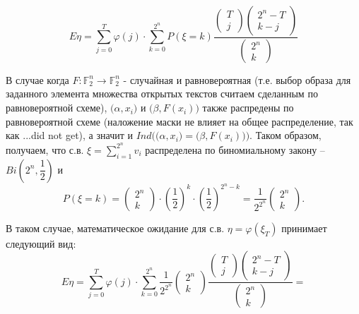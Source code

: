 \documentclass[utf8x, 14pt]{G7-32} %
\begin{document}
$$ E\eta = \sum_{j=0}^T \varphi(j)\cdot \sum_{k = 0}^{2^n} P(\xi = k) \dfrac{\left( \begin{aligned} T \\ j \end{aligned} \right) \left( \begin{aligned} 2^n-T \\ k-j \end{aligned} \right)}{\left( \begin{aligned} 2^n \\ k \end{aligned} \right)} $$


В случае когда $F: \mathbb{F}_2^n \to \mathbb{F}_2^n$ - случайная и равновероятная (т.е. выбор образа для заданного элемента множества открытых текстов считаем сделанным по равновероятной схеме), $\big(\alpha, x_i\big)$ и $\big(\beta, F(x_i)\big)$ также распредены по равновероятной схеме (наложение маски не влияет на общее распределение, так как ...did not get), а значит и $Ind\Big(\big(\alpha, x_i\big) = \big(\beta, F(x_i)\big)\Big)$. Таком образом, получаем, что с.в. $\xi = \sum_{i = 1}^{2^n} v_i$ распределена по биномиальному закону -- $Bi\left(2^n, \dfrac{1}{2}\right)$ и 
$$P(\xi = k) = \left( \begin{aligned} 2^n \\ k \end{aligned} \right) \cdot \left(\dfrac{1}{2}\right)^{k} \cdot \left(\dfrac{1}{2}\right)^{2^n-k} = \dfrac{1}{2^{2^n}} \left( \begin{aligned} 2^n \\ k \end{aligned} \right) .$$

В таком случае, математическое ожидание для с.в. $\eta = \varphi(\xi_T)$ принимает следующий вид:
$$E\eta = \sum_{j=0}^T \varphi(j)\cdot \sum_{k = 0}^{2^n} \dfrac{1}{2^{2^n}} \left( \begin{aligned} 2^n \\ k \end{aligned} \right) \dfrac{\left( \begin{aligned} T \\ j \end{aligned} \right) \left( \begin{aligned} 2^n-T \\ k-j \end{aligned} \right)}{\left( \begin{aligned} 2^n \\ k \end{aligned} \right)} =$$ 
\end{document}

